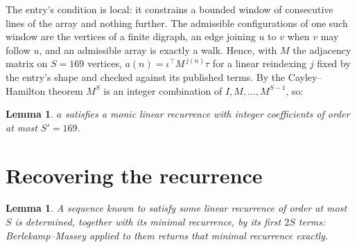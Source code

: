 \documentclass[11pt,a4paper]{article}
\theoremstyle{plain}
\newtheorem{lemma}[theorem]{Lemma}
\theoremstyle{definition}
\begin{document}
The entry's condition is local: it constrains a bounded window of consecutive lines of the
array and nothing further. The admissible configurations of one such window are the vertices
of a finite digraph, an edge joining $u$ to $v$ when $v$ may follow $u$, and an admissible
array is exactly a walk. Hence, with $M$ the adjacency matrix on $S=169$ vertices,
$a(n)=\iota^{\!\top}M^{\,j(n)}\tau$ for a linear reindexing $j$ fixed by the entry's shape
and checked against its published terms. By the Cayley--Hamilton theorem $M^{S}$ is an
integer combination of $I,M,\dots,M^{S-1}$, so:

\begin{lemma}\label{lem:cf}
$a$ satisfies a monic linear recurrence with integer coefficients of order at most
$S'=169$.
\end{lemma}

\section{Recovering the recurrence}

\begin{lemma}\label{lem:bm}
A sequence known to satisfy some linear recurrence of order at most $S$ is determined, together
with its minimal recurrence, by its first $2S$ terms: Berlekamp--Massey applied to them returns
that minimal recurrence exactly.
\end{lemma}
\end{document}
